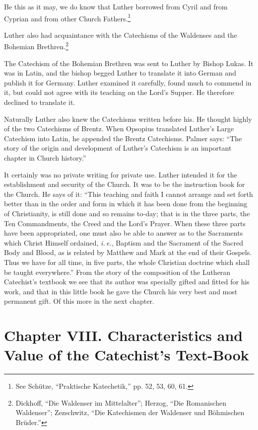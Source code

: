 Be this as it may, we do know that Luther
borrowed from Cyril and from Cyprian and from other Church Fathers.\footnote{See Schütze, “Praktische Katechetik,” pp. 52, 53, 60, 61.}

Luther also had acquaintance with the Catechisms of the Waldenses and the Bohemian Brethren.\footnote{Dickhoff, “Die Waldenser im Mittelalter”; Herzog, “Die Romanischen Waldenser”; Zezschwitz, “Die Katechismen der Waldenser und Böhmischen Brüder.”}

The Catechism of the Bohemian Brethren was sent to Luther by Bishop Lukas. It was in Latin, and the bishop begged Luther to translate it into German and publish it for Germany. Luther examined it carefully, found much to commend in it, but could not agree with its teaching on the Lord’s Supper. He therefore declined to translate it.

Naturally Luther also knew the Catechisms written before his. He thought highly of the two Catechisms of Brentz. When Opsopius translated Luther’s Large Catechism into Latin, he appended the Brentz Catechisms. Palmer says: “The story of the origin and development of Luther’s Catechism is an important chapter in Church history.”

It certainly was no private writing for private use. Luther intended it for the establishment and security of the Church.  It was to be the instruction book for the Church. He says of it: “This teaching and faith I cannot arrange and set forth better than in the order and form in which it has been done
from the beginning of Christianity, is still done and so remains to-day; that is in the three parts, the Ten Commandments, the Creed and the Lord’s Prayer. When these three parts have been appropriated, one must also be able to answer as to the Sacraments which Christ Himself ordained, \emph{i.\,e.}, Baptism and the Sacrament of the Sacred Body and Blood, as is related by Matthew and Mark at the end of their Gospels. Thus we have for all time, in five parts, the whole Christian doctrine which shall be taught everywhere.” From the story of the composition of the Lutheran Catechist’s textbook we see that its author was specially gifted and fitted for his work, and that in this little book he gave the Church his very best and most permanent gift. Of this more in the next chapter.

\chapter[Chapter VIII. Characteristics and Value]{Chapter VIII. Characteristics and Value of the Catechist’s Text-Book}

